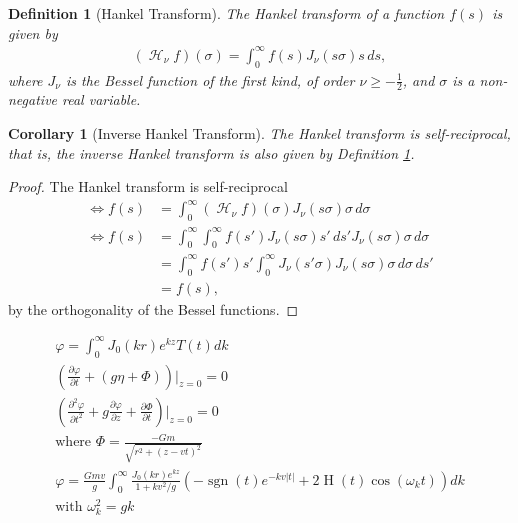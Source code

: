 \documentclass[10pt]{article}
\DeclareMathOperator{\sgn}{sgn}
\DeclareMathOperator{\Heavi}{H}
\DeclareMathOperator{\Hsign}{\mathscr{H}}
\newcommand\Hank[2][0]{{(\Hsign_{#1} #2 ) }}
\newtheorem{definition}[theorem]{Definition}
\newtheorem{corollary}[theorem]{Corollary}
\begin{document}
\begin{definition}[Hankel Transform]
\label{def:hanktrans}
The Hankel transform of a function $f(s)$ is given by
\begin{align*}
\Hank[\nu]{f}(\sigma) = \int_0^\infty f(s) J_\nu(s \sigma) s \, ds,
\end{align*}
where $J_\nu$ is the Bessel function of the first kind, of order $\nu \geq -\frac{1}{2}$, and $\sigma$ is a non-negative real variable.
\end{definition}

\begin{corollary}[Inverse Hankel Transform]
\label{def:invhanktrans}
The Hankel transform is self-reciprocal, that is, the inverse Hankel transform is also given by Definition \ref{def:hanktrans}.
\end{corollary}
\begin{proof}
The Hankel transform is self-reciprocal
\begin{align*}
\iff f(s) &= \int_0^\infty \Hank[\nu]{f}(\sigma) J_\nu(s \sigma) \sigma \, d\sigma \\
\iff f(s) &= \int_0^\infty \int_0^\infty f(s') J_\nu(s \sigma) s' \, ds' J_\nu(s \sigma) \sigma \, d\sigma \\
&= \int_0^\infty f(s') s' \int_0^\infty J_\nu(s' \sigma) J_\nu(s \sigma) \sigma \, d\sigma \, ds' \\
&= f(s),
\end{align*}
by the orthogonality of the Bessel functions.
\end{proof}

\newpage

\begin{align*}
\varphi = \int_0^\infty J_0(kr) e^{kz} T(t) dk \\
\left( \frac{\partial \varphi}{\partial t} + (g \eta + \Phi) \right) \bigg|_{z=0} = 0 \\
\left( \frac{\partial^2 \varphi}{\partial t^2} + g \frac{\partial \varphi}{\partial z} + \frac{\partial \Phi}{\partial t} \right) \bigg|_{z=0} = 0\\
\text{where }\Phi = \frac{-Gm}{\sqrt{r^2+(z-vt)^2}} \\
\varphi = \frac{Gmv}{g} \int_0^\infty \frac{J_0(kr)e^{kz}}{1+kv^2/g} \left(-\sgn(t)e^{-kv|t|} + 2 \Heavi (t)\cos(\omega_k t) \right)dk \\
\text{with } \omega_k^2=gk
\end{align*}
\end{document}

